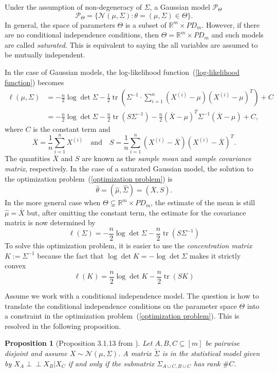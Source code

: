 \documentclass[10pt,a4paper]{article}
\newtheorem{proposition}{Proposition}
\newcommand{\indep}{\perp \!\!\! \perp}
\begin{document}
Under the assumption of non-degeneracy of $\Sigma$, a Gaussian model $\mathcal{P}_\Theta$
\[\mathcal{P}_\Theta=\{\mathcal{N}(\mu,\Sigma):\theta=(\mu,\Sigma)\in \Theta\}.\]
In general, the space of parameters $\Theta$ is a subset of $\mathbb{R}^m \times PD_m$. However, if there are no conditional independence conditions, then $\Theta=\mathbb{R}^m \times PD_m$ and such models are called \emph{saturated}. This is equivalent to saying the all variables are assumed to be mutually independent.

In the case of Gaussian models, the log-likelihood function~(\ref{log-likelihood function})  becomes
\begin{align}\label{Gaussian log-likelihood}
\ell(\mu,\Sigma)&=-\frac{n}{2}\log \det \Sigma - \frac{1}{2}\operatorname{tr}\left(\Sigma^{-1}\cdot \sum_{i=1}^n(X^{(i)}-\mu)(X^{(i)}-\mu)^T\right)+C \nonumber\\
		&=-\frac{n}{2}\log \det \Sigma - \frac{n}{2}\operatorname{tr}\left(S\Sigma^{-1}\right)- \frac{n}{2}\left(\overline{X}-\mu\right)^T\Sigma^{-1}\left(\overline{X}-\mu\right)+C,
\end{align}
where $C$ is the constant term and
\[\overline{X}=\frac{1}{n}\sum_{i=1}^nX^{(i)} \quad \text{and} \quad S=\frac{1}{n}\sum_{i=1}^n(X^{(i)}-\overline{X})(X^{(i)}-\overline{X})^T.\]
The quantities $\overline{X}$ and $S$ are known as the \emph{sample mean} and \emph{sample covariance matrix}, respectively.
In the case of a saturated Gaussian model, the solution to the optimization problem~(\ref{optimization problem}) is
\[\hat{\theta}=(\hat{\mu},\hat{\Sigma})=(\overline{X},S).\]
In the more general case when $\Theta\subsetneq\mathbb{R}^m \times PD_m$, the estimate of the mean is still $\hat{\mu}=\overline{X}$ but, after omitting the constant term, the estimate for the covariance matrix is now determined by
\begin{equation*}
\ell(\Sigma)=-\frac{n}{2}\log \det \Sigma - \frac{n}{2}\operatorname{tr}\left(S\Sigma^{-1}\right)
\end{equation*}
To solve this optimization problem, it is easier to use the \emph{concentration matrix} $K:=\Sigma^{-1}$ because the fact that $\log \det K=-\log \det \Sigma$ makes it strictly convex
\begin{equation}
\ell(K)=\frac{n}{2}\log \det K - \frac{n}{2}\operatorname{tr}\left(SK\right)
\end{equation}

Assume we work with a conditional independence model. The question is how to translate the conditional independence conditions on the parameter space $\Theta$ into a constraint in the optimization problem~(\ref{optimization problem}). This is resolved in the following proposition.
\begin{proposition}[Proposition 3.1.13 from \cite{drton2008lectures}]\label{prop: CI submatrix condition}
Let $A,B,C\subseteq[m]$ be pairwise disjoint and assume  $X\sim \mathcal{N}(\mu, \Sigma)$. A matrix $\tilde{\Sigma}$ is in the statistical model given by $X_A\indep X_B|X_C$ if and only if the submatrix $\Sigma_{A\cup C,B \cup C}$ has rank $\#C$.
\end{proposition}
\end{document}
